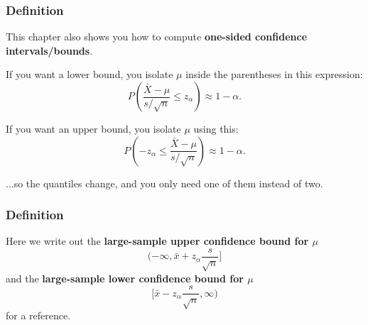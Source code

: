 \documentclass{beamer}
\begin{document}


\begin{frame}
\frametitle{Definition}

This chapter also shows you how to compute \textbf{one-sided confidence intervals/bounds}.
\newline

If you want a lower bound, you isolate $\mu$ inside the parentheses in this expression:
\[
P\left( \frac{\bar{X} - \mu}{s /\sqrt{n} } \le z_{\alpha} \right) \approx 1 - \alpha.
\]

If you want an upper bound, you isolate $\mu$ using this:
\[
P\left(-z_{\alpha} \le \frac{\bar{X} - \mu}{s /\sqrt{n} }  \right) \approx 1 - \alpha.
\]

...so the quantiles change, and you only need one of them instead of two.
\end{frame}

\begin{frame}
\frametitle{Definition}

Here we write out the \textbf{large-sample upper confidence bound for $\mu$}
\[
(- \infty, \bar{x} + z_{\alpha} \frac{s}{\sqrt{n}}]
\]
and the \textbf{large-sample lower confidence bound for $\mu$}
\[
[\bar{x} - z_{\alpha} \frac{s}{\sqrt{n}}, \infty)
\]
for a reference.

\end{frame}
\end{document}
